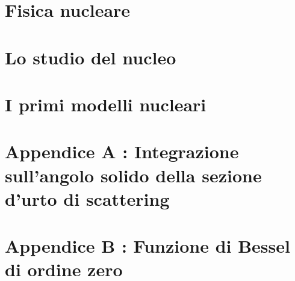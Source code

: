 \documentclass{tufte-book} %
\theoremstyle{definition}
\theoremstyle{theorem}
\theoremstyle{plain}
\theoremstyle{remark}
\theoremstyle{remark}
\begin{document}





\cleardoublepage


\cleardoublepage

\chapter{Fisica nucleare}\label{ch:fisica-nucleare}
       
\chapter{Lo studio del nucleo}\label{ch:studio-del-nucleo}

       
\chapter{I primi modelli nucleari}\label{ch:modelli-nucleari}

        
\appendix
\chapter{Appendice A : Integrazione sull'angolo solido della sezione d'urto di scattering}
\label{ch:integrazione-sezione-urto-angolo-solido}
 

\chapter{Appendice B : Funzione di Bessel di ordine zero}
\label{ch:funzione-bessel-zero}

\end{document}

